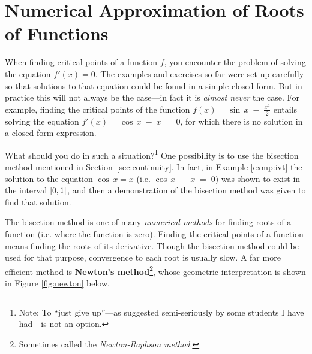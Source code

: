 \section{Numerical Approximation of Roots of Functions}\label{sec:numeric-root-approx}
When finding critical points of a function $f$, you encounter the problem of
solving the equation $f'(x)=0$. The examples and exercises so far were set up
carefully so that solutions to that equation could be found in a simple closed
form. But in practice this will not always be the case---in fact it is
\emph{almost never} the case.
For example, finding the critical points of the function
$f(x) = \sin\,x \;-\; \frac{x^2}{2}$
entails solving the equation $f'(x) = \cos\,x \;-\; x ~=~ 0$, for which there is
no solution in a closed-form expression.

What should you do in such a situation?\footnote{Note: To ``just give up''---as
suggested semi-seriously by some students I have had---is not an option.}  One
possibility is to use the bisection method mentioned in
Section~\ref{sec:continuity}. In fact, in Example \ref{exmp:ivt} the solution to the equation
$\cos\,x = x$ (i.e. $\cos\,x \;-\; x \;=\;0$) was shown to exist in the interval
$\lbrack 0,1 \rbrack$, and then a demonstration of the bisection method was given to
find that solution.

The bisection method is one of many \emph{numerical methods} for finding roots
of a function (i.e. where the function is zero). Finding the critical points of
a function means finding the roots of its derivative. Though the bisection
method could be used for that purpose, convergence to each root is usually
slow. A far more efficient method is
\textbf{Newton's method}\footnote{Sometimes called the \emph{Newton-Raphson
method}.}, whose geometric interpretation is shown in Figure \ref{fig:newton}
below.

